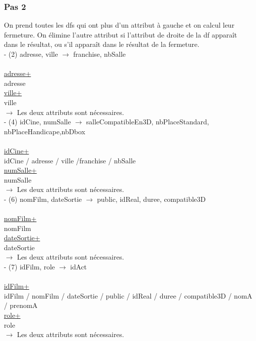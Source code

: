 \documentclass[a4paper,sffamily,12pt]{article}
\begin{document}
				\vspace{0.5cm}
									
			\subsubsection{Pas 2}

				\vspace{0.5cm}
	
				On prend toutes les dfs qui ont plus d'un attribut à gauche et on calcul leur fermeture. On élimine l'autre attribut si l'attribut de droite de la df apparaît dans le résultat, ou s'il apparaît dans le résultat de la fermeture. \\
				
				\noindent - (2) adresse, ville $\rightarrow$ franchise, nbSalle \\
					\\
					\underline{adresse+} \\
					adresse \\
					\underline{ville+} \\
					ville \\
				$\rightarrow$ Les deux attributs sont nécessaires. \\

				\noindent - (4) idCine, numSalle $\rightarrow$ salleCompatibleEn3D, nbPlaceStandard, nbPlaceHandicape,nbDbox \\
					\\
					\underline{idCine+} \\
					idCine / adresse / ville /franchise / nbSalle \\
					\underline{numSalle+} \\
					numSalle \\
				$\rightarrow$ Les deux attributs sont nécessaires. \\
				
				\noindent - (6) nomFilm, dateSortie $\rightarrow$ public, idReal, duree, compatible3D \\																						\\
					\underline{nomFilm+} \\
					nomFilm \\
					\underline{dateSortie+} \\
					dateSortie \\
				$\rightarrow$ Les deux attributs sont nécessaires. \\
			
				\noindent - (7) idFilm, role $\rightarrow$  idAct \\
					\\
					\underline{idFilm+} \\
					idFilm / nomFilm / dateSortie / public / idReal / duree / compatible3D / nomA / prenomA \\
					\underline{role+} \\
					role \\
				$\rightarrow$ Les deux attributs sont nécessaires. \\
					
\end{document}

